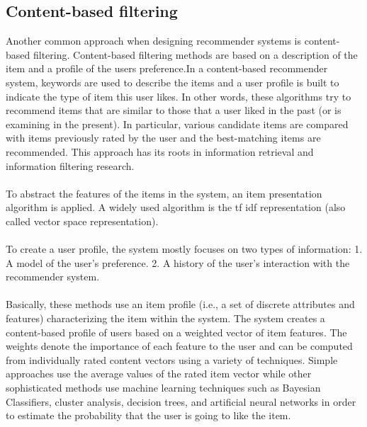 \documentclass[paper=a4, fontsize=12pt]{scrartcl}
\numberwithin{equation}{section}		%
\numberwithin{figure}{section}			%
\numberwithin{table}{section}				%
\begin{document}
\subsection{Content-based filtering}
Another common approach when designing recommender systems is content-based filtering. Content-based filtering methods are based on a description of the item and a profile of the users preference.In a content-based recommender system, keywords are used to describe the items and a user profile is built to indicate the type of item this user likes. In other words, these algorithms try to recommend items that are similar to those that a user liked in the past (or is examining in the present). In particular, various candidate items are compared with items previously rated by the user and the best-matching items are recommended. This approach has its roots in information retrieval and information filtering research.
\\
\\
To abstract the features of the items in the system, an item presentation algorithm is applied. A widely used algorithm is the tf idf representation (also called vector space representation).
\\
\\
To create a user profile, the system mostly focuses on two types of information: 1. A model of the user's preference. 2. A history of the user's interaction with the recommender system.
\\
\\
Basically, these methods use an item profile (i.e., a set of discrete attributes and features) characterizing the item within the system. The system creates a content-based profile of users based on a weighted vector of item features. The weights denote the importance of each feature to the user and can be computed from individually rated content vectors using a variety of techniques. Simple approaches use the average values of the rated item vector while other sophisticated methods use machine learning techniques such as Bayesian Classifiers, cluster analysis, decision trees, and artificial neural networks in order to estimate the probability that the user is going to like the item.
\end{document}

